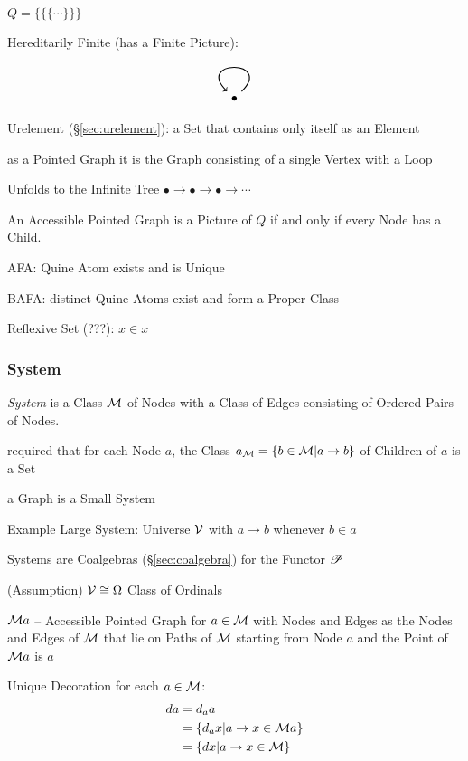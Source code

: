 $Q = \{\{\{\cdots\}\}\}$

Hereditarily Finite (has a Finite Picture):
\[
  \begin{tikzpicture}
    \node (A) {$\bullet$};
    \draw[->,thick,loop] (A) to (A);
  \end{tikzpicture}
\]

Urelement (\S\ref{sec:urelement}): a Set that contains only itself as
an Element

as a Pointed Graph it is the Graph consisting of a single Vertex with
a Loop

Unfolds to the Infinite Tree $\bullet \to \bullet
\to \bullet \to \cdots$

An Accessible Pointed Graph is a Picture of $Q$ if and only if every
Node has a Child. \cite{aczel88}

AFA: Quine Atom exists and is Unique

BAFA: distinct Quine Atoms exist and form a Proper Class

Reflexive Set (???): $x \in x$



\subsubsection{System}\label{sec:system}
\cite{aczel88}

\emph{System} is a Class $\mathcal{M}$ of Nodes with a Class of Edges
consisting of Ordered Pairs of Nodes.

required that for each Node $a$, the Class $a_\mathcal{M} = \{b \in
\mathcal{M} | a \to b\}$ of Children of $a$ is a Set

a Graph is a Small System

Example Large System: Universe $\mathcal{V}$ with $a \to b$
whenever $b \in a$

Systems are Coalgebras (\S\ref{sec:coalgebra}) for the Functor $\mathscr{P}$

(Assumption) $\mathcal{V} \cong \Omega$ Class of Ordinals

$\mathcal{M} a$ -- Accessible Pointed Graph for $a \in \mathcal{M}$ with
Nodes and Edges as the Nodes and Edges of $\mathcal{M}$ that lie on
Paths of $\mathcal{M}$ starting from Node $a$ and the Point of
$\mathcal{M} a$ is $a$

Unique Decoration for each $a \in \mathcal{M}$:
\begin{align*}
  d a &= d_a a \\
      &= \{d_a x | a \to x \in \mathcal{M} a\} \\
      &= \{d x | a \to x \in \mathcal{M}\}
\end{align*}

